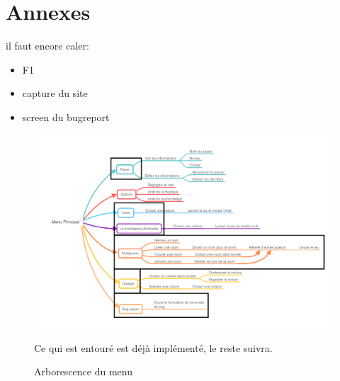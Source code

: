 \documentclass[12pt,a4paper]{article}
\begin{document}
\section*{Annexes}
\listoffigures
il faut encore caler:
\begin{itemize}
    \item F1
    \item capture du site
    \item screen du bugreport
    
\end{itemize}
\begin{figure}[h]
    \centering
    \includegraphics[width=20cm, angle=90]{Menu_Principal.png}
    \caption{Arborescence du menu}
    \label{fig:mindmap}
    Ce qui est entouré est déjà implémenté, le reste suivra.
\end{figure}
\end{document}
